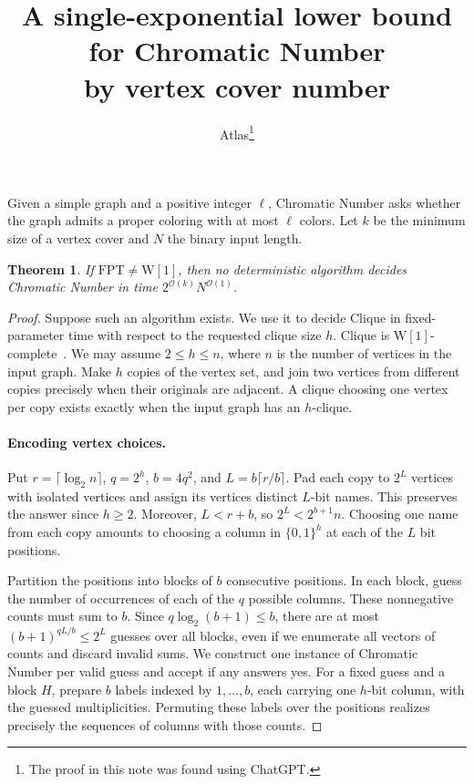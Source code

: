 \documentclass[11pt]{article}
\title{A single-exponential lower bound for Chromatic Number\\by vertex cover number}
\author{Atlas\thanks{The proof in this note was found using ChatGPT.}}
\date{}
\newtheorem{theorem}{Theorem}
\begin{document}
\maketitle

Given a simple graph and a positive integer \(\ell\), Chromatic Number
asks whether the graph admits a proper coloring with at most \(\ell\)
colors. Let \(k\) be the minimum size of a vertex cover and \(N\) the
binary input length.

\hypertarget{cover-w1}{}\begin{theorem}\label{cover-w1}
If \(\mathrm{FPT}\ne\mathrm{W[1]}\), then no deterministic algorithm
decides Chromatic Number in time \(2^{\mathcal O(k)}N^{\mathcal O(1)}\).
\end{theorem}

\begin{proof}
Suppose such an algorithm exists. We use it to decide Clique in
fixed-parameter time with respect to the requested clique size \(h\).
Clique is \(\mathrm{W[1]}\)-complete~\cite{df}. We may assume
\(2\le h\le n\), where \(n\) is the number of vertices in the input
graph. Make \(h\) copies of the vertex set, and join two vertices
from different copies precisely when their originals are adjacent.
A clique choosing one vertex per copy exists exactly when the input
graph has an \(h\)-clique.

\paragraph{Encoding vertex choices.}
Put \(r=\lceil\log_2 n\rceil\), \(q=2^h\), \(b=4q^2\), and
\(L=b\lceil r/b\rceil\). Pad each copy to \(2^L\) vertices with
isolated vertices and assign its vertices distinct \(L\)-bit names.
This preserves the answer since \(h\ge2\). Moreover, \(L<r+b\), so
\(2^L<2^{b+1}n\). Choosing one name from each copy amounts to
choosing a column in \(\{0,1\}^h\) at each of the \(L\) bit positions.

Partition the positions into blocks of \(b\) consecutive positions.
In each block, guess the number of occurrences of each of the \(q\)
possible columns. These nonnegative counts must sum to \(b\).
Since \(q\log_2(b+1)\le b\), there are at most
\((b+1)^{qL/b}\le2^L\) guesses over all blocks, even if we enumerate
all vectors of counts and discard invalid sums. We construct one
instance of Chromatic Number per valid guess and accept if any answers
yes. For a fixed guess and a block \(H\), prepare \(b\) labels
indexed by \(1,\ldots,b\), each carrying one \(h\)-bit column, with the
guessed multiplicities. Permuting these labels over the positions
realizes precisely the sequences of columns with those counts.


\end{proof}
\end{document}
